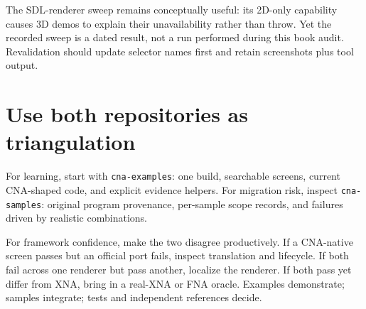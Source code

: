 The SDL-renderer sweep remains conceptually useful: its 2D-only capability causes 3D demos to
explain their unavailability rather than throw.  Yet the recorded sweep is a dated result, not a
run performed during this book audit.  Revalidation should update selector names first and retain
screenshots plus tool output.

\section{Use both repositories as triangulation}

For learning, start with \texttt{cna-examples}: one build, searchable screens, current CNA-shaped
code, and explicit evidence helpers.  For migration risk, inspect \texttt{cna-samples}: original
program provenance, per-sample scope records, and failures driven by realistic combinations.

For framework confidence, make the two disagree productively.  If a CNA-native screen passes but
an official port fails, inspect translation and lifecycle.  If both fail across one renderer but
pass another, localize the renderer.  If both pass yet differ from XNA, bring in a real-XNA or FNA
oracle.  Examples demonstrate; samples integrate; tests and independent references decide.
